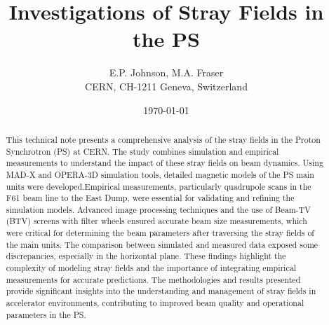 \documentclass{cernatsnote}
\title{Investigations of Stray Fields in the PS}
\author{
	E.P. Johnson, M.A. Fraser\; \\		
	CERN, CH-1211 Geneva, Switzerland
}
\date{\today}
\begin{document}
\maketitle

\begin{abstract}
This technical note presents a comprehensive analysis of the stray fields in the Proton Synchrotron (PS) at CERN. The study combines simulation and empirical measurements to understand the impact of these stray fields on beam dynamics. Using MAD-X and OPERA-3D simulation tools, detailed magnetic models of the PS main units were developed.Empirical measurements, particularly quadrupole scans in the F61 beam line to the East Dump, were essential for validating and refining the simulation models. Advanced image processing techniques and the use of Beam-TV (BTV) screens with filter wheels ensured accurate beam size measurements, which were critical for determining the beam parameters after traversing the stray fields of the main units. The comparison between simulated and measured data exposed some discrepancies, especially in the horizontal plane. These findings highlight the complexity of modeling stray fields and the importance of integrating empirical measurements for accurate predictions. The methodologies and results presented provide significant insights into the understanding and management of stray fields in accelerator environments, contributing to improved beam quality and operational parameters in the PS.

\end{abstract}
\\ \\ \\ 
\newpage

\begingroup
\color{black}
\tableofcontents
\endgroup

\pagebreak










\end{document}
